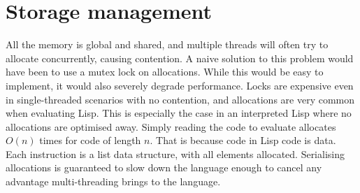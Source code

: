 





\section{Storage management}
\label{sec:storage}
All the memory is global and shared, and multiple threads will often try
to allocate concurrently, causing contention. A naive solution to this problem
would have been to use a mutex lock on allocations. While this would be easy to
implement, it would also severely degrade performance. Locks are expensive even
in single-threaded scenarios with no contention, and allocations are very common
when evaluating Lisp. This is especially the case in an interpreted Lisp where no
allocations are optimised away. Simply reading the code to evaluate allocates
\(O(n)\) times for code of length \(n\). That is because code in Lisp code is data.
Each instruction is a list data structure, with all elements allocated.
Serialising allocations is guaranteed to slow down the language enough to cancel
any advantage multi-threading brings to the language.

